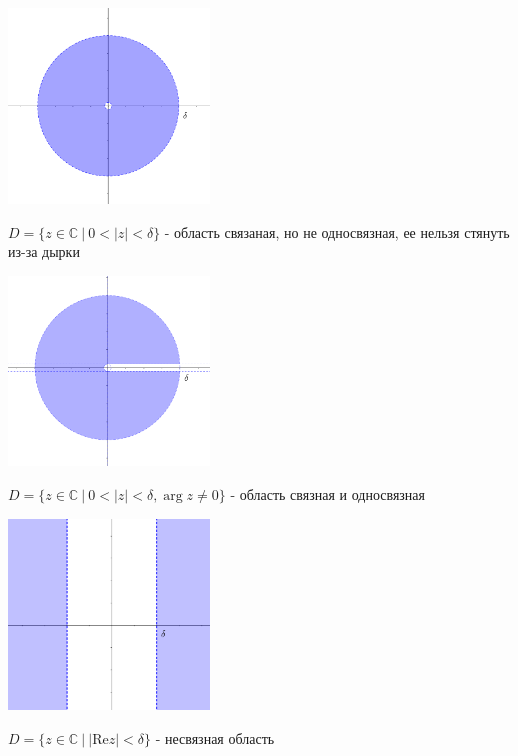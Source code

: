 \begin{multicols}{2}
    \includegraphics[width=0.4\textwidth]{addchapters2/images/addchapters2_2025_02_07_1}

     $D = \{z \in \mathbb{C} \ \Big| \ 0 < |z| < \delta\}$ - область связаная, но не односвязная, ее нельзя стянуть из-за дырки

    \mediumvspace

    \includegraphics[width=0.4\textwidth]{addchapters2/images/addchapters2_2025_02_07_2}

     $D = \{z \in \mathbb{C} \ \Big| \ 0 < |z| < \delta, \arg z \neq 0\}$ - область связная и односвязная

    \mediumvspace

    \includegraphics[width=0.4\textwidth]{addchapters2/images/addchapters2_2025_02_07_3}

     $D = \{z \in \mathbb{C} \ \Big| \ |\mathrm{Re} z| < \delta\}$ - несвязная область

    \mediumvspace


\end{multicols}
